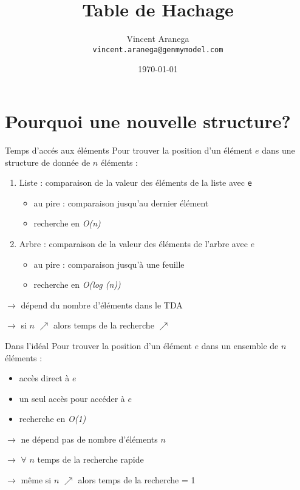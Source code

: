 \documentclass{beamer}
\title[Short Paper Title]{Table de Hachage}
\author{Vincent Aranega\\\texttt{vincent.aranega@genmymodel.com}}
\date{\today}
\begin{document}
  \maketitle

  \section{Pourquoi une nouvelle structure\@?}
  \begin{frame}{Temps d'accés aux éléments}
    Pour trouver la position d’un élément $e$ dans une structure de donnée de $n$ éléments :
    \begin{enumerate}
      \item{Liste : comparaison de la valeur des éléments de la liste
      avec \texttt{e}}
      \begin{itemize}
        \item{au pire : comparaison jusqu’au dernier élément}
        \item{recherche en \textit{O(n)}}
      \end{itemize}
      \item{Arbre : comparaison de la valeur des éléments de l’arbre avec $e$}
      \begin{itemize}
        \item{au pire : comparaison jusqu’à une feuille}
        \item{recherche en \textit{O(log (n))}}
      \end{itemize}
    \end{enumerate}

  $\rightarrow$ dépend du nombre d’éléments dans le TDA

  $\rightarrow$ si $n$ $\nearrow$ alors temps de la recherche $\nearrow$

  \end{frame}

  \begin{frame}{Dans l'idéal}
    Pour trouver la position d’un élément $e$ dans un ensemble de $n$ éléments :
    \begin{itemize}
      \item{accès direct à $e$}
      \item{un seul accès pour accéder à $e$}
      \item{recherche en \textit{O(1)}}
    \end{itemize}

    $\rightarrow$ ne dépend pas de nombre d’éléments $n$

    $\rightarrow$ $\forall$ $n$ temps de la recherche rapide

    $\rightarrow$ même si $n$ $\nearrow$ alors temps de la recherche = 1
  \end{frame}
\end{document}
